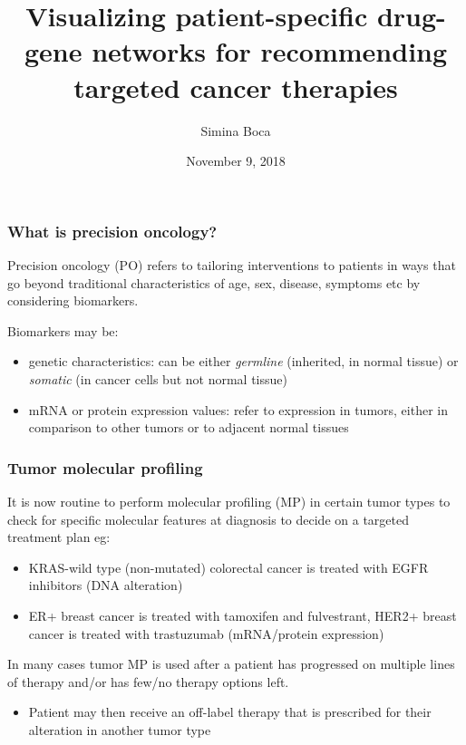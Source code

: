 \documentclass{beamer}
\title[Visualizing patient-specific networks for recommending targeted therapies]{Visualizing patient-specific drug-gene networks for recommending targeted cancer therapies}
\author{Simina Boca}
\date{November 9, 2018}
\institute{@siminaboca\\smb310@georgetown.edu\\Innovation Center for Biomedical Informatics,\\Departments of Oncology and Biostatistics, Bioinformatics and Biomathematics, Georgetown University Medical Center} \vspace{1.5cm}
\begin{document}
\begin{frame}
\titlepage
\end{frame}


\begin{frame}
\frametitle{What is precision oncology?}

Precision oncology (PO) refers to tailoring interventions to patients in ways that go beyond traditional characteristics of age, sex, disease, symptoms etc by considering
{\color{red}biomarkers}. 
\vspace{0.6cm}

Biomarkers may be:
\begin{itemize}
\item genetic characteristics: can be either \textit{germline} (inherited, in normal tissue) or \textit{somatic} (in cancer cells but not normal tissue)
\item mRNA or protein expression values: refer to expression in tumors, either in comparison to other tumors or to adjacent normal tissues
\end{itemize}

\end{frame}


\begin{frame}
\frametitle{Tumor molecular profiling}

It is now routine to perform {\color{red}molecular profiling (MP)} in certain tumor types to check for specific molecular features at diagnosis to decide on a {\color{red}targeted treatment plan} eg:
\begin{itemize}
\item KRAS-wild type (non-mutated) colorectal cancer is treated with EGFR inhibitors {\color{red}(DNA alteration)}
\item ER+ breast cancer is treated with tamoxifen and fulvestrant, HER2+ breast cancer is treated with trastuzumab {\color{red}(mRNA/protein expression)}
\end{itemize}

\vspace{0.8cm}

In many cases tumor MP is used after a patient has progressed on multiple lines of therapy and/or has few/no therapy options left.
\begin{itemize}
\item Patient may then receive an off-label therapy that is prescribed for their alteration in another tumor type
\end{itemize}

\end{frame}
\end{document}
